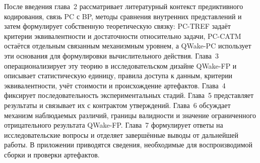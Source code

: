 После введения глава~2 рассматривает литературный контекст предиктивного
кодирования, связь PC с BP, методы сравнения внутренних представлений и затем
формулирует собственную теоретическую связку: PC-TREF задаёт критерии
эквивалентности и достаточности относительно задачи, PC-CATM остаётся отдельным
связанным механизмным уровнем, а QWake-PC использует эти основания для
формулировки вычислительного действия. Глава~3 операционализирует эту теорию в
исследовательском дизайне QWake-FP и описывает статистическую
единицу, правила доступа к данным, критерии эквивалентности, учёт стоимости и
происхождение артефактов. Глава~4 фиксирует последовательность экспериментальных
стадий. Глава~5 представляет результаты и связывает их с контрактом утверждений.
Глава~6 обсуждает механизм наблюдаемых различий, границы валидности и значение
ограниченного отрицательного результата QWake-FP. Глава~7 формулирует ответы на
исследовательские вопросы и отделяет завершённые выводы от дальнейшей работы.
В приложении приводятся сведения, необходимые для воспроизводимой сборки и
проверки артефактов.
